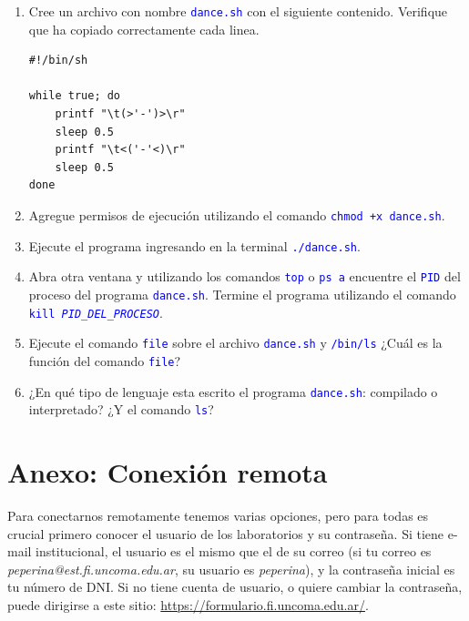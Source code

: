 \documentclass[12pt]{article}
\newcommand{\cw}[1]{\texttt{\textcolor{blue}{#1}}}
\begin{document}
\begin{enumerate}[resume]

    \item Cree un archivo con nombre \cw{dance.sh} con el siguiente contenido.
        Verifique que ha copiado correctamente cada linea.

        \begin{verbatim}
#!/bin/sh

while true; do
    printf "\t(>'-')>\r"
    sleep 0.5
    printf "\t<('-'<)\r"
    sleep 0.5
done
        \end{verbatim}

    \item Agregue permisos de ejecución utilizando el comando \cw{chmod +x
        dance.sh}.

    \item Ejecute el programa ingresando en la terminal \cw{./dance.sh}.

    \item Abra otra ventana y utilizando los comandos \cw{top} o \cw{ps a}
        encuentre el \cw{PID} del proceso del programa \cw{dance.sh}.
        Termine el programa utilizando el comando \cw{kill
        \emph{PID\_DEL\_PROCESO}}.

    \item Ejecute el comando \cw{file} sobre el archivo \cw{dance.sh} y
        \cw{/bin/ls} ¿Cuál es la función del comando \cw{file}?

    \item ¿En qué tipo de lenguaje esta escrito el programa \cw{dance.sh}:
        compilado o interpretado? ¿Y el comando \cw{ls}?

\end{enumerate}

\clearpage
\section*{Anexo: Conexión remota}
\label{sec:anexoConexion}

Para conectarnos remotamente tenemos varias opciones, pero para todas es
crucial primero conocer el usuario de los laboratorios y su contraseña. Si
tiene e-mail institucional, el usuario es el mismo que el de su correo (si tu
correo es \emph{peperina@est.fi.uncoma.edu.ar}, su usuario es
\emph{peperina}), y la contraseña inicial es tu número de DNI. Si no tiene
cuenta de usuario, o quiere cambiar la contraseña, puede dirigirse a este
sitio: \url{https://formulario.fi.uncoma.edu.ar/}.
\end{document}
